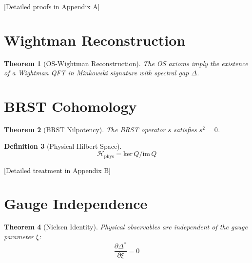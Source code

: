 \documentclass[11pt,a4paper]{article}
\newcommand{\Hilbert}{\mathcal{H}}
\newcommand{\im}{\mathrm{im}\,}
\newcommand{\ke}{\mathrm{ker}\,}
\theoremstyle{plain}
\newtheorem{theorem}{Theorem}[section]
\theoremstyle{definition}
\newtheorem{definition}[theorem]{Definition}
\begin{document}
[Detailed proofs in Appendix A]

\section{Wightman Reconstruction}
\label{sec:wightman}

\begin{theorem}[OS-Wightman Reconstruction]
The OS axioms imply the existence of a Wightman QFT in Minkowski signature 
with spectral gap $\Delta$.
\end{theorem}

\section{BRST Cohomology}
\label{sec:brst}

\begin{theorem}[BRST Nilpotency]
\label{thm:nilpotency}
The BRST operator $s$ satisfies $s^2 = 0$.
\end{theorem}

\begin{definition}[Physical Hilbert Space]
\begin{equation}
\Hilbert_{\mathrm{phys}} = \ke Q / \im Q
\label{eq:physical_hilbert}
\end{equation}
\end{definition}

[Detailed treatment in Appendix B]

\section{Gauge Independence}
\label{sec:gauge}

\begin{theorem}[Nielsen Identity]
\label{thm:nielsen}
Physical observables are independent of the gauge parameter $\xi$:
\begin{equation}
\frac{\partial\Delta^*}{\partial\xi} = 0
\end{equation}
\end{theorem}
\end{document}
